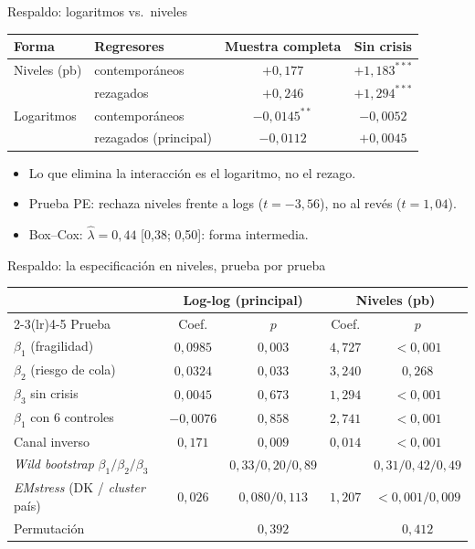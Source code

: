 \documentclass[aspectratio=169]{beamer}
\begin{document}
\begin{frame}{Respaldo: logaritmos vs.\ niveles}
\centering
\footnotesize
\begin{tabular}{llcc}
\toprule
Forma & Regresores & Muestra completa & Sin crisis \\
\midrule
Niveles (pb) & contemporáneos & $+0{,}177$ & $+1{,}183^{***}$ \\
 & rezagados & $+0{,}246$ & $+1{,}294^{***}$ \\
\addlinespace
Logaritmos & contemporáneos & $-0{,}0145^{**}$ & $-0{,}0052$ \\
 & rezagados (principal) & $-0{,}0112$ & $+0{,}0045$ \\
\bottomrule
\end{tabular}
\vspace{6pt}
\begin{itemize}\footnotesize
\item Lo que elimina la interacción es el logaritmo, no el rezago.
\item Prueba PE: rechaza niveles frente a logs ($t=-3{,}56$), no al revés ($t=1{,}04$).
\item Box--Cox: $\hat\lambda=0{,}44$ [0,38; 0,50]: forma intermedia.
\end{itemize}
\end{frame}

\begin{frame}{Respaldo: la especificación en niveles, prueba por prueba}
\centering
\scriptsize
\begin{tabular}{lcccc}
\toprule
 & \multicolumn{2}{c}{Log-log (principal)} & \multicolumn{2}{c}{Niveles (pb)} \\
\cmidrule(lr){2-3}\cmidrule(lr){4-5}
Prueba & Coef. & $p$ & Coef. & $p$ \\
\midrule
$\beta_1$ (fragilidad) & $0{,}0985$ & $0{,}003$ & $4{,}727$ & $<0{,}001$ \\
$\beta_2$ (riesgo de cola) & $0{,}0324$ & $0{,}033$ & $3{,}240$ & $0{,}268$ \\
$\beta_3$ sin crisis & $0{,}0045$ & $0{,}673$ & $1{,}294$ & $<0{,}001$ \\
$\beta_1$ con 6 controles & $-0{,}0076$ & $0{,}858$ & $2{,}741$ & $<0{,}001$ \\
Canal inverso & $0{,}171$ & $0{,}009$ & $0{,}014$ & $<0{,}001$ \\
\textit{Wild bootstrap} $\beta_1/\beta_2/\beta_3$ & & $0{,}33/0{,}20/0{,}89$ & & $0{,}31/0{,}42/0{,}49$ \\
\textit{EMstress} (DK / \textit{cluster} país) & $0{,}026$ & $0{,}080/0{,}113$ & $1{,}207$ & $<0{,}001/0{,}009$ \\
Permutación & & $0{,}392$ & & $0{,}412$ \\
\bottomrule
\end{tabular}
\end{frame}
\end{document}
